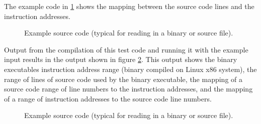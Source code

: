 The example code in \ref{Tutorial:dwarfInstructionAddressToSourceLineExampleSourceCode}
shows the mapping between the source code lines and the instruction addresses.


\begin{figure}[!h]
{\indent
{\mySmallFontSize

\begin{latexonly}
   
\end{latexonly}

\begin{htmlonly}
   
\end{htmlonly}

}
}
\caption{Example source code (typical for reading in a binary or source file).}
\label{Tutorial:dwarfInstructionAddressToSourceLineExampleSourceCode}
\end{figure}

Output from the compilation of this test code and running it with the example input
results in the output shown in figure \ref{Tutorial:dwarfInstructionAddressToSourceLineExampleOutput}.
This output shows the binary executables instruction address range (binary compiled on
Linux x86 system), the range of lines of source code used by the binary executable,
the mapping of a source code range of line numbers to the instruction addresses,
and the mapping of a range of instruction addresses to the source code line numbers.


\begin{figure}[!h]
{\indent
{\mySmallFontSize

\begin{latexonly}
   
\end{latexonly}

\begin{htmlonly}
   
\end{htmlonly}

}
}
\caption{Example source code (typical for reading in a binary or source file).}
\label{Tutorial:dwarfInstructionAddressToSourceLineExampleOutput}
\end{figure}






